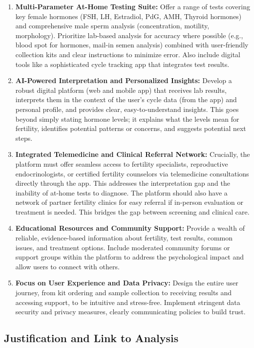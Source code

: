 \documentclass{article}
\begin{document}
\begin{enumerate}[label=\roman*.]
    \item \textbf{Multi-Parameter At-Home Testing Suite:} Offer a range of tests covering key female hormones (FSH, LH, Estradiol, PdG, AMH, Thyroid hormones) and comprehensive male sperm analysis (concentration, motility, morphology). Prioritize lab-based analysis for accuracy where possible (e.g., blood spot for hormones, mail-in semen analysis) combined with user-friendly collection kits and clear instructions to minimize error. Also include digital tools like a sophisticated cycle tracking app that integrates test results.
    \item \textbf{AI-Powered Interpretation and Personalized Insights:} Develop a robust digital platform (web and mobile app) that receives lab results, interprets them in the context of the user's cycle data (from the app) and personal profile, and provides clear, easy-to-understand insights. This goes beyond simply stating hormone levels; it explains what the levels mean for fertility, identifies potential patterns or concerns, and suggests potential next steps.
    \item \textbf{Integrated Telemedicine and Clinical Referral Network:} Crucially, the platform must offer seamless access to fertility specialists, reproductive endocrinologists, or certified fertility counselors via telemedicine consultations directly through the app. This addresses the interpretation gap and the inability of at-home tests to diagnose. The platform should also have a network of partner fertility clinics for easy referral if in-person evaluation or treatment is needed. This bridges the gap between screening and clinical care.
    \item \textbf{Educational Resources and Community Support:} Provide a wealth of reliable, evidence-based information about fertility, test results, common issues, and treatment options. Include moderated community forums or support groups within the platform to address the psychological impact and allow users to connect with others.
    \item \textbf{Focus on User Experience and Data Privacy:} Design the entire user journey, from kit ordering and sample collection to receiving results and accessing support, to be intuitive and stress-free. Implement stringent data security and privacy measures, clearly communicating policies to build trust.
\end{enumerate}

\subsection{Justification and Link to Analysis}
\end{document}
